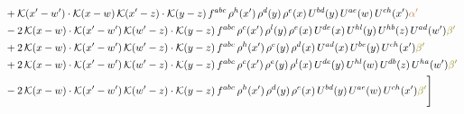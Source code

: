 \documentclass[9pt]{article}
\numberwithin{equation}{section}
\begin{document}
\begin{align}
&+\mathcal{K}(x'-w')\cdot\mathcal{K}(x-w)\,\mathcal{K}(x'-z)\cdot\mathcal{K}(y-z)\, f^{abc}\,\rho^{h}(x')\,\rho^{d}(y)\,\rho^{e}(x)\,U^{bd}(y)\,U^{ae}(w)\,U^{ch}(x'){\color{brown} \alpha'}\notag \\ &-2\,\mathcal{K}(x-w)\cdot\mathcal{K}(x'-w')\,\mathcal{K}(w'-z)\cdot\mathcal{K}(y-z)\, f^{abc}\,\rho^{c}(x')\,\rho^{l}(y)\,\rho^{e}(x)\,U^{de}(x)\,U^{hl}(y)\,U^{hb}(z)\,U^{ad}(w'){\color{olive} \beta'}\notag\\ & +2\,\mathcal{K}(x-w)\cdot\mathcal{K}(x'-w')\,\mathcal{K}(w'-z)\cdot\mathcal{K}(y-z)\, f^{abc}\,\rho^{h}(x')\,\rho^{e}(y)\,\rho^{d}(x)\,U^{ad}(x)\,U^{be}(y)\,U^{ch}(x'){\color{olive} \beta'}\notag\\ & +2\,\mathcal{K}(x-w)\cdot\mathcal{K}(x'-w')\,\mathcal{K}(w'-z)\cdot\mathcal{K}(y-z)\, f^{abc}\,\rho^{c}(x')\,\rho^{e}(y)\,\rho^{l}(x)\,U^{de}(y)\,U^{hl}(w)\,U^{db}(z)\,U^{ha}(w'){\color{olive} \beta'}\notag\\ &-2\,\mathcal{K}(x-w)\cdot\mathcal{K}(x'-w')\,\mathcal{K}(w'-z)\cdot\mathcal{K}(y-z)\, f^{abc}\,\rho^{h}(x')\,\rho^{d}(y)\,\rho^{e}(x)\,U^{bd}(y)\,U^{ae}(w)\,U^{ch}(x'){\color{olive} \beta'}\Bigg] 
\end{align}     
\end{document}
